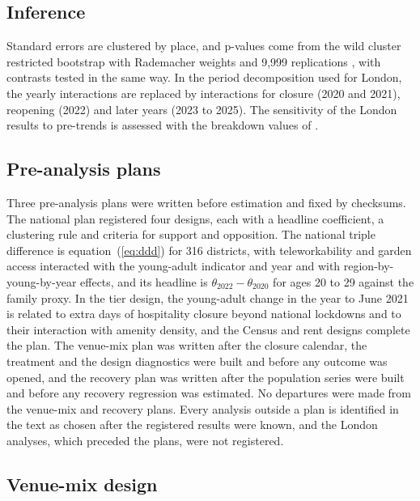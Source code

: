 \documentclass[11pt,a4paper]{article}
\begin{document}
\subsection{Inference}

Standard errors are clustered by place, and p-values come from the wild cluster restricted bootstrap with Rademacher weights and 9,999 replications \citep{cameron2008,mackinnon2018,roodman2019}, with contrasts tested in the same way. In the period decomposition used for London, the yearly interactions are replaced by interactions for closure (2020 and 2021), reopening (2022) and later years (2023 to 2025). The sensitivity of the London results to pre-trends is assessed with the breakdown values of \citet{rambachan2023}.

\subsection{Pre-analysis plans}\label{sec:pap}

Three pre-analysis plans were written before estimation and fixed by checksums. The national plan registered four designs, each with a headline coefficient, a clustering rule and criteria for support and opposition. The national triple difference is equation~(\ref{eq:ddd}) for 316 districts, with teleworkability and garden access interacted with the young-adult indicator and year and with region-by-young-by-year effects, and its headline is $\theta_{2022} - \theta_{2020}$ for ages 20 to 29 against the family proxy. In the tier design, the young-adult change in the year to June 2021 is related to extra days of hospitality closure beyond national lockdowns and to their interaction with amenity density, and the Census and rent designs complete the plan. The venue-mix plan was written after the closure calendar, the treatment and the design diagnostics were built and before any outcome was opened, and the recovery plan was written after the population series were built and before any recovery regression was estimated. No departures were made from the venue-mix and recovery plans. Every analysis outside a plan is identified in the text as chosen after the registered results were known, and the London analyses, which preceded the plans, were not registered.

\subsection{Venue-mix design}
\end{document}
